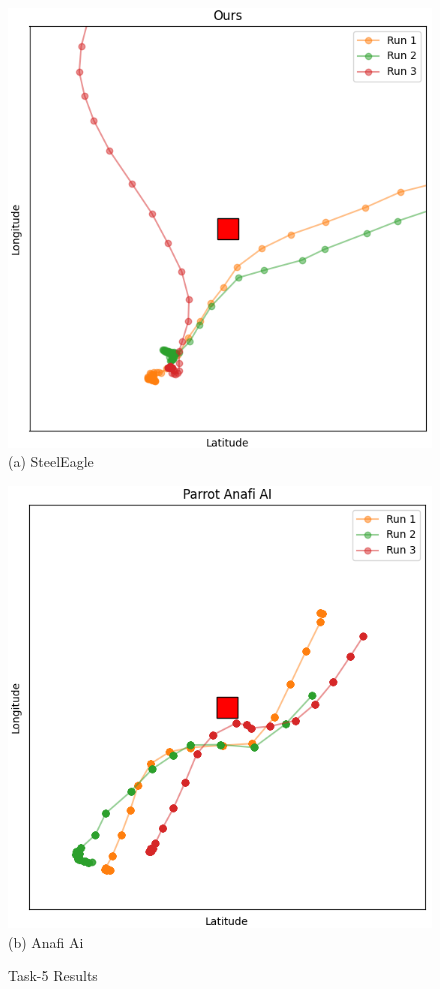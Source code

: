 \begin{figure}
\begin{minipage}[b]{0.495\linewidth}
\centering
\includegraphics[width=0.95\linewidth]{chapter4/FIGS/fig-obstacle-path-ours.png}
{(a) SteelEagle}
\end{minipage}
\begin{minipage}[b]{0.495\linewidth}
\centering
\includegraphics[width=0.95\linewidth]{chapter4/FIGS/fig-obstacle-path-anafiai.png}
{(b) Anafi Ai}
\end{minipage}
\caption{Task-5 Results}
\label{fig:obstacle-path}
\end{figure}

